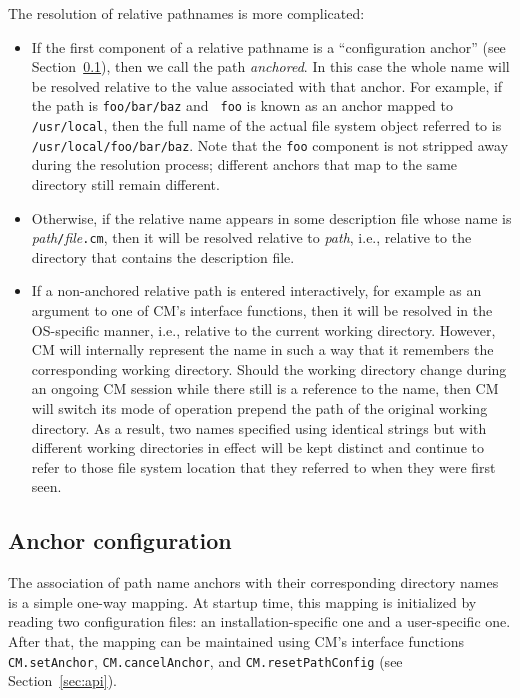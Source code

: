 \documentclass{article}
\begin{document}
The resolution of relative pathnames is more complicated:

\begin{itemize}
\item If the first component of a relative pathname is a
``configuration anchor'' (see Section~\ref{sec:anchors}), then we call
the path {\em anchored}.  In this case the
whole name will be resolved relative to the value associated with that
anchor.  For example, if the path is {\tt foo/bar/baz} and {\tt
foo} is known as an anchor mapped to {\tt /usr/local}, then the
full name of the actual file system object referred to is {\tt
/usr/local/foo/bar/baz}. Note that the {\tt foo} component is not
stripped away during the resolution process; different anchors that
map to the same directory still remain different.
\item Otherwise, if the relative name appears in some description file
whose name is {\it path}{\tt /}{\it file}{\tt .cm}, then it will be
resolved relative to {\it path}, i.e., relative to the directory that
contains the description file.
\item If a non-anchored relative path is entered interactively, for
example as an argument to one of CM's interface functions, then it
will be resolved in the OS-specific manner, i.e., relative to the
current working directory.  However, CM will internally represent the
name in such a way that it remembers the corresponding working
directory.  Should the working directory change during an ongoing CM
session while there still is a reference to the name, then CM will
switch its mode of operation prepend the path of the original working
directory. As a result, two names specified using identical
strings but with different working directories in effect will be kept
distinct and continue to refer to those file system location that they
referred to when they were first seen.
\end{itemize}

\subsection{Anchor configuration}
\label{sec:anchors}

The association of path name anchors with their corresponding
directory names is a simple one-way mapping.  At startup time, this
mapping is initialized by reading two configuration files: an
installation-specific one and a user-specific one.  After that, the
mapping can be maintained using CM's interface functions {\tt
CM.setAnchor}, {\tt CM.cancelAnchor}, and {\tt CM.resetPathConfig}
(see Section~\ref{sec:api}).
\end{document}
